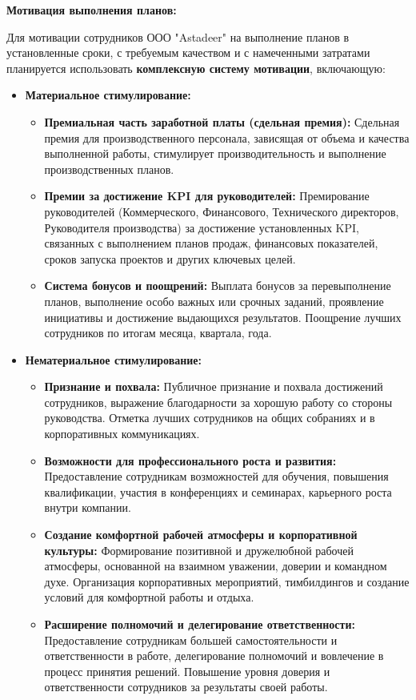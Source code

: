     \textbf{Мотивация выполнения планов:}

    Для мотивации сотрудников ООО "Astadeer" на выполнение планов в установленные сроки, с требуемым качеством и с намеченными затратами планируется использовать \textbf{комплексную систему мотивации}, включающую:

    \begin{itemize}
        \item \textbf{Материальное стимулирование:}
            \begin{itemize}
                \item \textbf{Премиальная часть заработной платы (сдельная премия):}  Сдельная премия для производственного персонала, зависящая от объема и качества выполненной работы, стимулирует производительность и выполнение производственных планов.
                \item \textbf{Премии за достижение KPI для руководителей:}  Премирование руководителей (Коммерческого, Финансового, Технического директоров, Руководителя производства) за достижение установленных KPI, связанных с выполнением планов продаж, финансовых показателей, сроков запуска проектов и других ключевых целей.
                \item \textbf{Система бонусов и поощрений:}  Выплата бонусов за перевыполнение планов, выполнение особо важных или срочных заданий, проявление инициативы и достижение выдающихся результатов.  Поощрение лучших сотрудников по итогам месяца, квартала, года.
            \end{itemize}
        \item \textbf{Нематериальное стимулирование:}
            \begin{itemize}
                \item \textbf{Признание и похвала:}  Публичное признание и похвала достижений сотрудников, выражение благодарности за хорошую работу со стороны руководства.  Отметка лучших сотрудников на общих собраниях и в корпоративных коммуникациях.
                \item \textbf{Возможности для профессионального роста и развития:}  Предоставление сотрудникам возможностей для обучения, повышения квалификации, участия в конференциях и семинарах, карьерного роста внутри компании.
                \item \textbf{Создание комфортной рабочей атмосферы и корпоративной культуры:}  Формирование позитивной и дружелюбной рабочей атмосферы, основанной на взаимном уважении, доверии и командном духе.  Организация корпоративных мероприятий, тимбилдингов и создание условий для комфортной работы и отдыха.
                \item \textbf{Расширение полномочий и делегирование ответственности:}  Предоставление сотрудникам большей самостоятельности и ответственности в работе, делегирование полномочий и вовлечение в процесс принятия решений.  Повышение уровня доверия и ответственности сотрудников за результаты своей работы.
            \end{itemize}
    \end{itemize}
    

